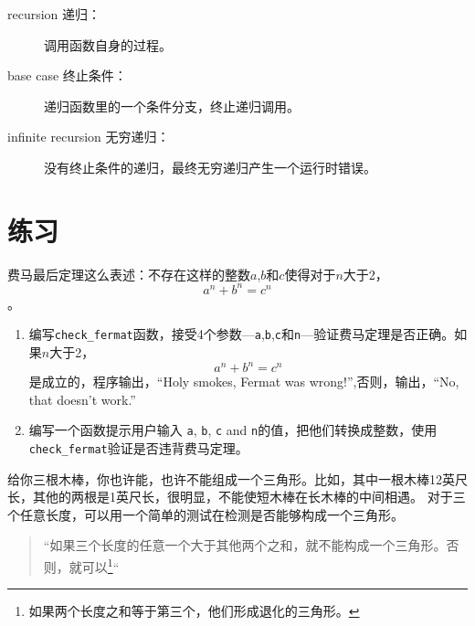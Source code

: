 {{\begin{description}
\item[recursion 递归：]调用函数自身的过程。

\item[base case 终止条件：] 递归函数里的一个条件分支，终止递归调用。

\item[infinite recursion 无穷递归：]没有终止条件的递归，最终无穷递归产生一个运行时错误。

\end{description}

\section{练习}

\begin{ex}


费马最后定理这么表述：不存在这样的整数$a$,$b$和$c$使得对于$n$大于2，\[ a^n + b^n = c^n \]。
\begin{enumerate}

\item 编写\verb"check_fermat"函数，接受4个参数---{\tt a},{\tt b},{\tt c}和{\tt n}---验证费马定理是否正确。如果$n$大于2，\[a^n + b^n = c^n \]是成立的，程序输出，``Holy smokes, Fermat was wrong!'',否则，输出，``No, that doesn't work.''

\item 编写一个函数提示用户输入 {\tt a}, {\tt b}, {\tt c} and {\tt n}的值，把他们转换成整数，使用\verb"check_fermat"验证是否违背费马定理。

\end{enumerate}
\end{ex}


\begin{ex}

给你三根木棒，你也许能，也许不能组成一个三角形。比如，其中一根木棒12英尺长，其他的两根是1英尺长，很明显，不能使短木棒在长木棒的中间相遇。
对于三个任意长度，可以用一个简单的测试在检测是否能够构成一个三角形。

\begin{quotation}
“如果三个长度的任意一个大于其他两个之和，就不能构成一个三角形。否则，就可以\footnote{如果两个长度之和等于第三个，他们形成退化的三角形。}“
\end{quotation}


\begin{enumerate}


\end{enumerate}
\end{ex}}}
